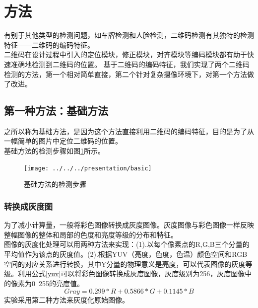 \section{方法}
有别于其他类型的检测问题，如车牌检测和人脸检测，二维码检测有其独特的检测特征——二维码的编码特征。\\
二维码在设计过程中引入的定位模块，修正模块，对齐模块等编码模块都有助于快速准确地检测到二维码的位置。
基于二维码的编码特征，我们实现了两个二维码检测的方法，第一个相对简单直接，第二个针对复杂摄像环境下，对第一个方法做了改进。
\subsection{第一种方法：基础方法}
之所以称为基础方法，是因为这个方法直接利用二维码的编码特征，目的是为了从一幅简单的图片中定位二维码的位置。\\
基础方法的检测步骤如图\ref{fig:basic}所示。
\begin{figure}[h]
\centering
\texttt{[image: ../../../presentation/basic]}
\caption[steps]{基础方法的检测步骤}
\label{fig:basic}
\end{figure}
\subsubsection{转换成灰度图}
为了减小计算量，一般将彩色图像转换成灰度图像。灰度图像与彩色图像一样反映整幅图像的整体和局部的色度和亮度等级的分布和特征。\\
图像的灰度化处理可以用两种方法来实现：(1).以每个像素点的R,G,B三个分量的平均值作为该点的灰度值。(2).根据YUV（亮度，色度，色温）颜色空间和RGB空间的对应关系进行转换，其中Y分量的物理意义是亮度，可以代表图像的灰度等级。利用公式\ref{yuv}可以将彩色图像转换成灰度图像，灰度级别为256，灰度图像中的像素为0~255的亮度值。
\begin{equation}\label{yuv}
Gray = 0.299 * R + 0.5866 * G + 0.1145 * B
\end{equation}
实验采用第二种方法来灰度化原始图像。
